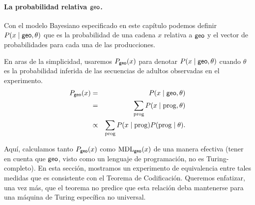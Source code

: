 
\paragraph{La probabilidad relativa ${\sf geo}$.} 

Con el modelo Bayesiano especificado en este capítulo podemos definir $P(x \mid {\sf geo}, \theta)$ que es la probabilidad de una cadena $x$ relativa a ${\sf geo}$ y el vector de probabilidades para cada una de las producciones.

En aras de la simplicidad, usaremos $P_{{\sf geo}}(x)$ para denotar $P(x \mid {\sf geo}, \theta)$ cuando $\theta$ es la probabilidad inferida de las secuencias de adultos observadas en el experimento.
%
\begin{eqnarray*}
\label{eqG}
P_{{\sf geo}}(x) &=& P(x \mid {\sf geo}, \theta)\\
&=& \sum_{{\rm prog}} P(x \mid {\rm prog}, \theta)\\
&\propto &\sum_{{\rm prog}} P(x \mid {\rm prog}) P({\rm prog} \mid \theta).
\end{eqnarray*}
%


Aquí, calculamos tanto $P_{{\sf geo}}(x)$ como ${\rm MDL}_{{\sf geo}}(x)$ de una manera efectiva (tener en cuenta que ${\sf geo}$, visto como un lenguaje de programación, no es Turing-completo). En esta sección, mostramos un experimento de equivalencia entre tales medidas que es consistente con el Teorema de Codificación. Queremos enfatizar, una vez más, que el teorema no predice que esta relación deba mantenerse para una máquina de Turing específica no universal.


